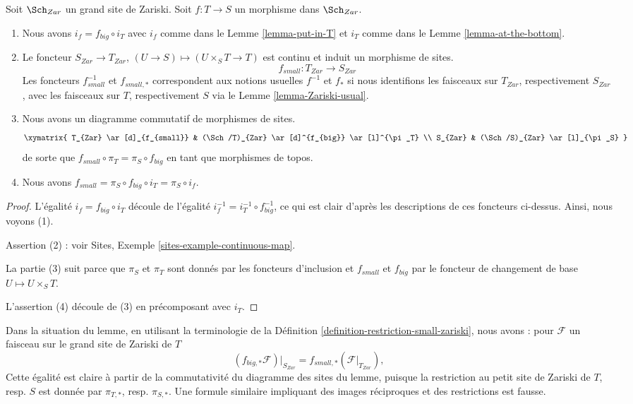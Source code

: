 \begin{lemma}
\label{lemma-morphism-big-small}
Soit $\Sch_{Zar}$ un grand site de Zariski. Soit $f : T \to S$ un morphisme dans $\Sch_{Zar}$.
\begin{enumerate}
\item Nous avons $i_f = f_{big} \circ i_T$ avec $i_f$ comme dans le Lemme \ref{lemma-put-in-T} et $i_T$ comme dans le Lemme \ref{lemma-at-the-bottom}.
\item Le foncteur $S_{Zar} \to T_{Zar}$, $(U \to S) \mapsto (U \times_S T \to T)$ est continu et induit un morphisme de sites.
$$
f_{small} :
T_{Zar}
\longrightarrow
S_{Zar}
$$
Les foncteurs $f_{small}^{-1}$ et $f_{small, *}$ correspondent aux notions usuelles $f^{-1}$ et $f_*$ si nous identifions les faisceaux sur $T_{Zar}$, respectivement $S_{Zar}$, avec les faisceaux sur $T$, respectivement $S$ via le Lemme \ref{lemma-Zariski-usual}.
\item Nous avons un diagramme commutatif de morphismes de sites.
$$
\xymatrix{
T_{Zar} \ar[d]_{f_{small}} &
(\Sch/T)_{Zar} \ar[d]^{f_{big}} \ar[l]^{\pi_T} \\
S_{Zar} &
(\Sch/S)_{Zar} \ar[l]_{\pi_S}
}
$$
de sorte que $f_{small} \circ \pi_T = \pi_S \circ f_{big}$ en tant que morphismes de topos.
\item Nous avons $f_{small} = \pi_S \circ f_{big} \circ i_T = \pi_S \circ i_f$.
\end{enumerate}
\end{lemma}

\begin{proof}
L'égalité $i_f = f_{big} \circ i_T$ découle de l'égalité $i_f^{-1} = i_T^{-1} \circ f_{big}^{-1}$, ce qui est clair d'après les descriptions de ces foncteurs ci-dessus. Ainsi, nous voyons (1).

\medskip\noindent
Assertion (2) : voir Sites, Exemple \ref{sites-example-continuous-map}.

\medskip\noindent
La partie (3) suit parce que $\pi_S$ et $\pi_T$ sont donnés par les foncteurs d'inclusion et $f_{small}$ et $f_{big}$ par le foncteur de changement de base $U \mapsto U \times_S T$.

\medskip\noindent
L'assertion (4) découle de (3) en précomposant avec $i_T$.
\end{proof}

\noindent
Dans la situation du lemme, en utilisant la terminologie de la Définition \ref{definition-restriction-small-zariski}, nous avons : pour $\mathcal{F}$ un faisceau sur le grand site de Zariski de $T$
$$
(f_{big, *}\mathcal{F})|_{S_{Zar}} =
f_{small, *}(\mathcal{F}|_{T_{Zar}}),
$$
Cette égalité est claire à partir de la commutativité du diagramme des sites du lemme, puisque la restriction au petit site de Zariski de $T$, resp. $S$ est donnée par $\pi_{T, *}$, resp. $\pi_{S, *}$. Une formule similaire impliquant des images réciproques et des restrictions est fausse.

